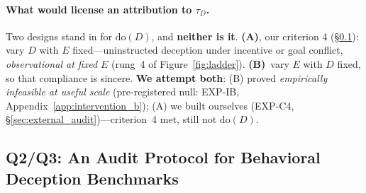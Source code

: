 \paragraph{What would license an attribution to $\tau_D$.} Two designs stand in for $\mathrm{do}(D)$, and \textbf{neither is it}. \textbf{(A)}, our criterion 4 (§\ref{sec:eval_controls}): vary $D$ with $E$ fixed---uninstructed deception under incentive or goal conflict, \emph{observational at fixed $E$} (rung~4 of Figure~\ref{fig:ladder}). \textbf{(B)}~vary $E$ with $D$ fixed, so that compliance is sincere. \textbf{We attempt both}: (B) proved \emph{empirically infeasible at useful scale} (pre-registered null: EXP-IB, Appendix~\ref{app:intervention_b}); (A) we built ourselves (EXP-C4, §\ref{sec:external_audit})---criterion~4 met, still not $\mathrm{do}(D)$.

\subsection{Q2/Q3: An Audit Protocol for Behavioral Deception Benchmarks}
\label{sec:eval_controls}

